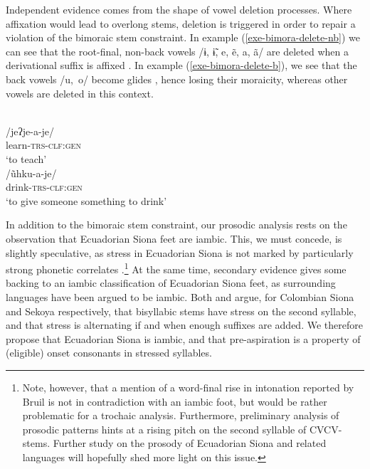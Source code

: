 \documentclass[output=paper]{langscibook}
\begin{document}
\begin{sloppypar}
Independent evidence comes from the shape of vowel deletion processes. Where affixation would lead to overlong stems, deletion is triggered in order to repair a violation of the bimoraic stem constraint. In example (\ref{exe-bimora-delete-nb}) we can see that the root-final, non-back vowels /ɨ, \~ɨ, e, ẽ, a, ã/ are deleted when a derivational suffix is affixed \citep[112]{Bruil:2014}. In example (\ref{exe-bimora-delete-b}), we see that the back vowels \mbox{/u, o/} become glides \citep[120]{Bruil:2014}, hence losing their moraicity, whereas other vowels are deleted in this context.
\end{sloppypar}


\begin{exe}
\ex\label{exe-bimora-delete}
\begin{xlist}
\ex\label{exe-bimora-delete-nb}
\glll [jeʔ.ja.je]\\
/jeʔje-a-je/ \\
learn-\textsc{trs-clf:gen}\\
\trans `to teach'
\ex\label{exe-bimora-delete-b}
\glll [õh.kʷa.je]\\
/ũhku-a-je/\\
drink-\textsc{trs-clf:gen}\\
\trans `to give someone something to drink'
\end{xlist}
\end{exe}


In addition to the bimoraic stem constraint, our prosodic analysis rests on the observation that Ecuadorian Siona feet are iambic. This, we must concede, is slightly speculative, as stress in Ecuadorian Siona is not marked by particularly strong phonetic correlates \citep[86]{Bruil:2014}.\footnote{Note, however, that a mention of a word-final rise in intonation reported by Bruil is not in contradiction with an iambic foot, but would be rather problematic for a trochaic analysis. Furthermore, preliminary analysis of prosodic patterns hints at a rising pitch on the second syllable of CVCV-stems. Further study on the prosody of Ecuadorian Siona and related languages will hopefully shed more light on this issue.} At the same time, secondary evidence gives some backing to an iambic classification of Ecuadorian Siona feet, as surrounding languages have been argued to be iambic. Both \citet[90--94]{Wheeler:1987a} and \citet[18--19]{JohnsonLevinsohn:1990} argue, for Colombian Siona and Sekoya respectively, that bisyllabic stems have stress on the second syllable, and that stress is alternating if and when enough suffixes are added. We therefore propose that Ecuadorian Siona is iambic, and that pre-aspiration is a property of (eligible) onset consonants in stressed syllables.
\end{document}
